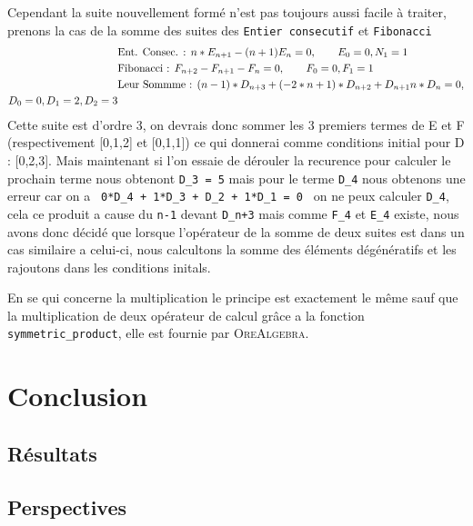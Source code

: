 \documentclass[12pt]{article}
\begin{document}
        \par Cependant la suite nouvellement formé n'est pas toujours aussi facile à traiter, prenons la cas
        de la somme des suites des  \texttt{Entier consecutif} et \texttt{Fibonacci}
        \begin{align*}
            &\textnormal{Ent. Consec. : } n*E_{n+1} - (n+1)E_n = 0, \qquad E_0 = 0, N_1 = 1\\
            &\textnormal{Fibonacci : } F_{n+2} - F_{n+1} - F_n = 0, \qquad F_0=0, F_1=1\\
            &\textnormal{Leur Sommme : } (n - 1)*D_{n+3} + (-2*n + 1)*D_{n+2} + D_{n+1} n*D_n = 0, \\
             D_0 = 0, D_1 = 2, D_2 = 3
        \end{align*} 
        Cette suite est d'ordre 3, on devrais donc sommer les 3 premiers termes de E et F (respectivement 
        [0,1,2] et [0,1,1]) ce qui donnerai comme conditions initial pour D : [0,2,3]. Mais maintenant si 
        l'on essaie de dérouler la recurence pour calculer le prochain terme nous obtenont \texttt{D\_3 = 5}
        mais pour le terme \texttt{D\_4} nous obtenons une erreur car on a \texttt{ 0*D\_4 + 1*D\_3 + D\_2 + 1*D\_1 = 0 }
        on ne  peux calculer \texttt{D\_4}, cela ce produit a cause du \texttt{n-1} devant \texttt{D\_{n+3}} 
        mais comme \texttt{F\_4} et \texttt{E\_4} existe, nous avons donc décidé que lorsque l'opérateur de la somme de deux suites est dans un cas similaire a celui-ci, nous calcultons la somme des éléments dégénératifs et les 
        rajoutons dans les conditions initals.
        \par En se qui concerne la multiplication le principe est exactement le même sauf que la 
        multiplication de deux opérateur de calcul grâce a la fonction \texttt{symmetric\_product},
        elle est fournie par \textsc{OreAlgebra}.

\setcounter{secnumdepth}{0}
\section{Conclusion}
    \subsection{Résultats}
    \subsection{Perspectives}
       

\end{document}
